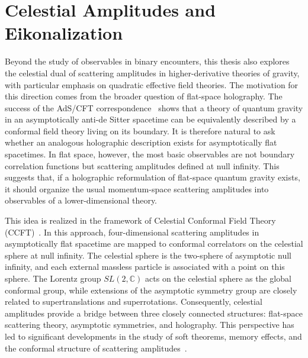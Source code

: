 \section{Celestial Amplitudes and Eikonalization}
{\color{black}
Beyond the study of observables in binary encounters, this thesis also explores the celestial dual of scattering amplitudes in higher-derivative theories of gravity, with particular emphasis on quadratic effective field theories. The motivation for this direction comes from the broader question of flat-space holography. The success of the AdS/CFT correspondence~\cite{Maldacena:1997re} shows that a theory of quantum gravity in an asymptotically anti-de Sitter spacetime can be equivalently described by a conformal field theory living on its boundary. It is therefore natural to ask whether an analogous holographic description exists for asymptotically flat spacetimes. In flat space, however, the most basic observables are not boundary correlation functions but scattering amplitudes defined at null infinity. This suggests that, if a holographic reformulation of flat-space quantum gravity exists, it should organize the usual momentum-space scattering amplitudes into observables of a lower-dimensional theory.

This idea is realized in the framework of Celestial Conformal Field Theory (CCFT)~\cite{Strominger:2013jfa,Strominger:2017zoo,Pasterski:2017ylz,Pasterski:2021raf,Donnay:2020guq}. In this approach, four-dimensional scattering amplitudes in asymptotically flat spacetime are mapped to conformal correlators on the celestial sphere at null infinity. The celestial sphere is the two-sphere of asymptotic null infinity, and each external massless particle is associated with a point on this sphere. The Lorentz group \(SL(2,\mathbb{C})\) acts on the celestial sphere as the global conformal group, while extensions of the asymptotic symmetry group are closely related to supertranslations and superrotations. Consequently, celestial amplitudes provide a bridge between three closely connected structures: flat-space scattering theory, asymptotic symmetries, and holography. This perspective has led to significant developments in the study of soft theorems, memory effects, and the conformal structure of scattering amplitudes~\cite{He:2014laa,Adamo:2019ipt,Gonzalez:2020tpi,Pasterski:2021fjn,Gonzo:2022tjm,Strominger:2021mtt}.

}
